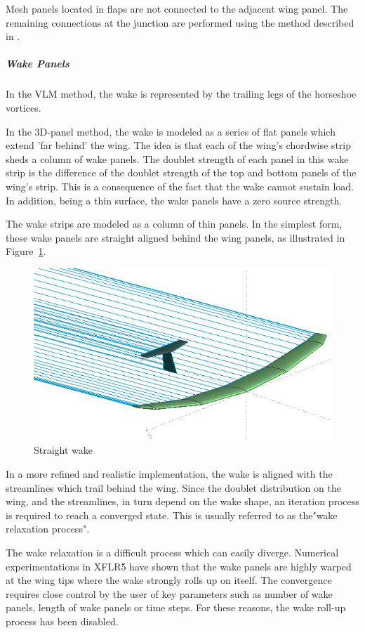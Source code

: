 \documentclass[a4paper,twoside,12pt,dvips]{article}
\begin{document}
Mesh panels located in flaps are not connected to the adjacent wing
panel. The remaining connections at the junction are performed using
the method described in \cite{Maskew}.

\subparagraph{Wake Panels}

In the VLM method, the wake is represented by the trailing legs of the
horseshoe vortices.

In the 3D-panel method, the wake is modeled as a series of flat panels
which extend 'far behind' the wing.\newline
The idea is that each of the wing's chordwise strip sheds a column of
wake panels. The doublet strength of each panel in this wake strip is
the difference of the doublet strength of the top and bottom panels of
the wing's strip. This is a consequence of the fact that the wake
cannot sustain load. In addition, being a thin surface, the wake
panels have a zero source strength.

The wake strips are modeled as a column of thin panels. In the
simplest form, these wake panels are straight aligned behind the wing
panels, as illustrated in Figure~\ref{fig:straight_wake}.

\begin{figure}[htbp]
  \includegraphics[width=0.8\linewidth]{img-13}\centering 
  \caption{Straight wake}
  \label{fig:straight_wake}
\end{figure}

In a more refined and realistic implementation, the wake is aligned
with the streamlines which trail behind the wing. Since the doublet
distribution on the wing, and the streamlines, in turn depend on the
wake shape, an iteration process is required to reach a converged
state. This is usually referred to as the"wake relaxation process".

The wake relaxation is a difficult process which can easily diverge.
Numerical experimentations in XFLR5 have shown that the wake panels
are highly warped at the wing tips where the wake strongly rolls up on
itself. The convergence requires close control by the user of key
parameters such as number of wake panels, length of wake panels or
time steps. For these reasons, the wake roll-up process has been
disabled.
\end{document}
